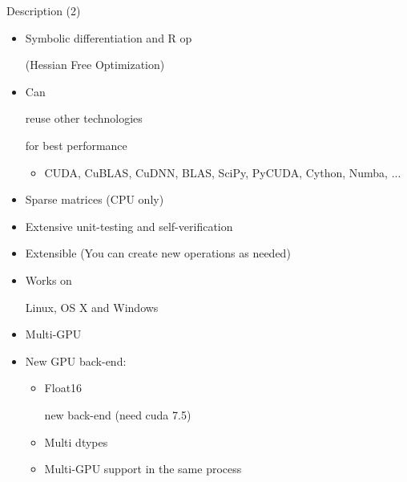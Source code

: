 \documentclass[utf8x,xcolor=pdftex,dvipsnames,table]{beamer}
\begin{document}
\begin{frame}{Description (2)}

  \begin{itemize}
    \item \begin{bf}Symbolic differentiation and R op\end{bf} (Hessian Free Optimization)
    \item Can \begin{bf}reuse other technologies\end{bf} for best performance
    \begin{itemize}
      \item CUDA, CuBLAS, CuDNN, BLAS, SciPy, PyCUDA, Cython, Numba, ...
    \end{itemize}
    \item Sparse matrices (CPU only)
    \item Extensive unit-testing and self-verification
    \item Extensible (You can create new operations as needed)
    \item Works on \begin{bf}Linux, OS X and Windows\end{bf}
    \item \begin{bf}Multi-GPU\end{bf}
    \item New GPU back-end:
      \begin{itemize}
      \item \begin{bf}Float16\end{bf} new back-end (need cuda 7.5)
      \item \begin{bf}Multi dtypes\end{bf}
      \item Multi-GPU support in the same process
      \end{itemize}
  \end{itemize}
\end{frame}





\end{document}
